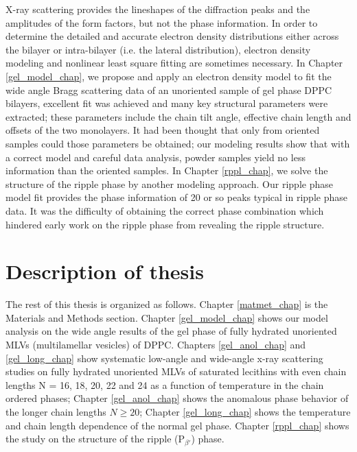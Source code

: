 X-ray scattering provides the lineshapes of the diffraction peaks
and the amplitudes of the form factors, but not the phase information. 
In order to determine the detailed and accurate electron density
distributions either across the bilayer or intra-bilayer (i.e. the
lateral distribution), electron density modeling and nonlinear least
square fitting are sometimes necessary. In Chapter \ref{gel_model_chap},
we propose and apply an electron density model to fit the wide
angle Bragg scattering data of an unoriented sample of gel phase DPPC
bilayers, excellent fit was achieved and many key structural parameters
were extracted; these parameters include the chain tilt angle, 
effective chain length and offsets of the two monolayers. It had been
thought that only from oriented samples could those parameters be obtained;
our modeling results show that with a correct model and careful data
analysis, powder samples yield no less information than the oriented
samples. In Chapter \ref{rppl_chap}, we solve the structure of the
ripple phase by another modeling approach. Our ripple phase model fit 
provides the phase information of 20 or so peaks typical in ripple phase data.
It was the difficulty of obtaining the correct phase combination which
hindered early work on the ripple phase from revealing the ripple
structure.

\section{Description of thesis}
\label{intro_chap_desc}

The rest of this thesis is organized as follows. 
Chapter \ref{matmet_chap} is the Materials and Methods section.
Chapter \ref{gel_model_chap} shows our model analysis on the wide
angle results of the gel phase of fully hydrated unoriented 
MLVs (multilamellar vesicles) of DPPC. Chapters \ref{gel_anol_chap} 
and \ref{gel_long_chap} show systematic
low-angle and wide-angle x-ray scattering studies on fully hydrated
unoriented MLVs of saturated lecithins with even chain
lengths N = 16, 18, 20, 22 and 24 as a function of temperature in the 
chain ordered phases; Chapter \ref{gel_anol_chap} shows the anomalous 
phase behavior of the longer chain lengths $N \geq 20$; Chapter 
\ref{gel_long_chap} shows the temperature and chain length dependence 
of the normal gel phase.  Chapter \ref{rppl_chap} shows the study on 
the structure of the ripple (P$_{\beta '}$) phase.
